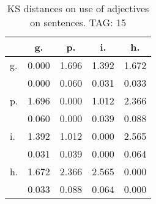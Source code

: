 \begin{table}[h!]
\begin{center}
\begin{tabular}{| l | c | c | c | c |}\hline
 & g. & p. & i. & h. \\\hline
g. & 0.000  & 1.696  & 1.392  & 1.672 \\\hline
 & 0.000  & 0.060  & 0.031  & 0.033 \\\hline
p. & 1.696  & 0.000  & 1.012  & 2.366 \\\hline
 & 0.060  & 0.000  & 0.039  & 0.088 \\\hline
i. & 1.392  & 1.012  & 0.000  & 2.565 \\\hline
 & 0.031  & 0.039  & 0.000  & 0.064 \\\hline
h. & 1.672  & 2.366  & 2.565  & 0.000 \\\hline
 & 0.033  & 0.088  & 0.064  & 0.000 \\\hline
\end{tabular}
\caption{KS distances on use of adjectives on sentences. TAG: 15}
\end{center}
\end{table}